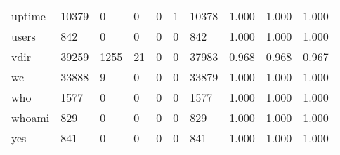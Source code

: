 \begin{longtable}{lp{2.0cm}p{2.0cm}p{2.0cm}p{2.0cm}p{2.0cm}p{2.0cm}p{2.0cm}p{2.0cm}p{2.0cm}}
uptime    &                  10379 &                                  0 &                                 0 &                                0 &                                 1 &                           10378 &                                   1.000 &                                  1.000 &                                1.000 \\
users     &                    842 &                                  0 &                                 0 &                                0 &                                 0 &                             842 &                                   1.000 &                                  1.000 &                                1.000 \\
vdir      &                  39259 &                               1255 &                                21 &                                0 &                                 0 &                           37983 &                                   0.968 &                                  0.968 &                                0.967 \\
wc        &                  33888 &                                  9 &                                 0 &                                0 &                                 0 &                           33879 &                                   1.000 &                                  1.000 &                                1.000 \\
who       &                   1577 &                                  0 &                                 0 &                                0 &                                 0 &                            1577 &                                   1.000 &                                  1.000 &                                1.000 \\
whoami    &                    829 &                                  0 &                                 0 &                                0 &                                 0 &                             829 &                                   1.000 &                                  1.000 &                                1.000 \\
yes       &                    841 &                                  0 &                                 0 &                                0 &                                 0 &                             841 &                                   1.000 &                                  1.000 &                                1.000 \\
\end{longtable}
